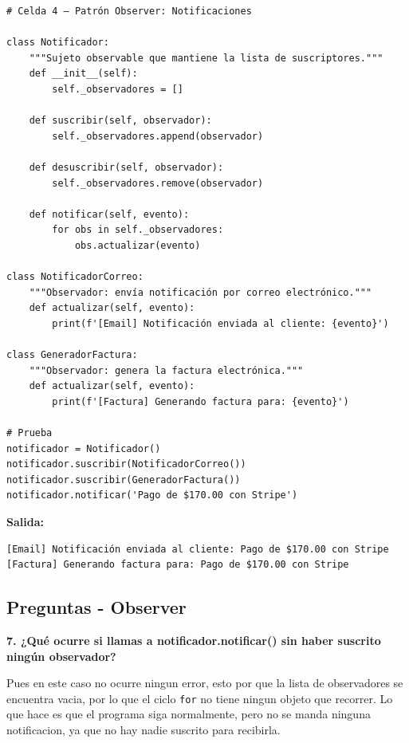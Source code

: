 \documentclass[letterpaper,11pt]{article}
\begin{document}
\begin{lstlisting}[style=pythonreport]
# Celda 4 – Patrón Observer: Notificaciones

class Notificador:
    """Sujeto observable que mantiene la lista de suscriptores."""
    def __init__(self):
        self._observadores = []

    def suscribir(self, observador):
        self._observadores.append(observador)

    def desuscribir(self, observador):
        self._observadores.remove(observador)

    def notificar(self, evento):
        for obs in self._observadores:
            obs.actualizar(evento)

class NotificadorCorreo:
    """Observador: envía notificación por correo electrónico."""
    def actualizar(self, evento):
        print(f'[Email] Notificación enviada al cliente: {evento}')

class GeneradorFactura:
    """Observador: genera la factura electrónica."""
    def actualizar(self, evento):
        print(f'[Factura] Generando factura para: {evento}')

# Prueba
notificador = Notificador()
notificador.suscribir(NotificadorCorreo())
notificador.suscribir(GeneradorFactura())
notificador.notificar('Pago de $170.00 con Stripe')
\end{lstlisting}
\par\noindent\textbf{Salida:}
\begin{lstlisting}[style=reportoutput,language={}]
[Email] Notificación enviada al cliente: Pago de $170.00 con Stripe
[Factura] Generando factura para: Pago de $170.00 con Stripe
\end{lstlisting}

\subsection*{Preguntas - Observer}

\textbf{7. ¿Qué ocurre si llamas a notificador.notificar() sin haber suscrito ningún observador?}

Pues en este caso no ocurre ningun error, esto por que la lista  de observadores se encuentra vacia, por lo que el ciclo \texttt{for} no tiene ningun objeto que recorrer. Lo que hace es que el programa siga normalmente, pero no se manda ninguna notificacion, ya que no hay nadie suscrito para recibirla.
\end{document}
